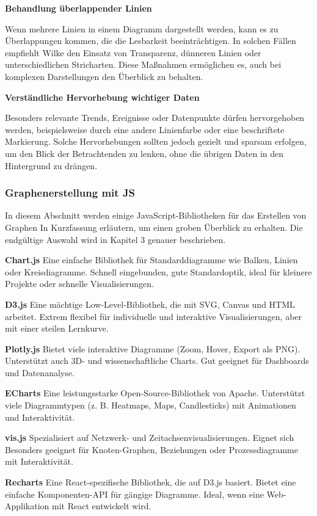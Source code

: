 \item
\textbf{Behandlung überlappender Linien}

Wenn mehrere Linien in einem Diagramm dargestellt werden, kann es zu Überlappungen kommen, die die Lesbarkeit beeinträchtigen.
In solchen Fällen empfiehlt Wilke den Einsatz von Transparenz, dünneren Linien oder unterschiedlichen Stricharten.
Diese Maßnahmen ermöglichen es, auch bei komplexen Darstellungen den Überblick zu behalten.
\item
\textbf{Verständliche Hervorhebung wichtiger Daten}

Besonders relevante Trends, Ereignisse oder Datenpunkte dürfen hervorgehoben werden, beispielsweise durch eine andere Linienfarbe oder eine beschriftete Markierung.
Solche Hervorhebungen sollten jedoch gezielt und sparsam erfolgen, um den Blick der Betrachtenden zu lenken, ohne die übrigen Daten in den Hintergrund zu drängen.

\subsubsection{Graphenerstellung mit JS}

In diesem Abschnitt werden einige JavaScript-Bibliotheken für das Erstellen von Graphen
In Kurzfassung erläutern, um einen groben Überblick zu erhalten.
Die endgültige Auswahl wird in Kapitel 3 genauer beschrieben.

\textbf{Chart.js}
Eine einfache Bibliothek für Standarddiagramme wie Balken, Linien
oder Kreisdiagramme.
Schnell eingebunden, gute Standardoptik, ideal für kleinere Projekte oder schnelle Visualisierungen. \cite{Chartjs2025}

\textbf{D3.js}
Eine mächtige Low-Level-Bibliothek, die mit \ac{SVG}, Canvas und HTML arbeitet.
Extrem flexibel für individuelle und interaktive Visualisierungen, aber mit einer steilen Lernkurve. \cite{D3js2025}

\textbf{Plotly.js}
Bietet viele interaktive Diagramme (Zoom, Hover, Export als PNG). Unterstützt
auch 3D- und wissenschaftliche Charts.
Gut geeignet für Dashboards und Datenanalyse. \cite{Plotlyjs2025}

\textbf{ECharts}
Eine leistungsstarke Open-Source-Bibliothek von Apache. Unterstützt viele
Diagrammtypen (z. B. Heatmaps, Maps, Candlesticks) mit Animationen und Interaktivität. \cite{ECharts2025}

\textbf{vis.js}
Spezialisiert auf Netzwerk- und Zeitachsenvisualisierungen. Eignet sich
Besonders geeignet für Knoten-Graphen, Beziehungen oder Prozessdiagramme mit Interaktivität. \cite{Visjs2025}

\textbf{Recharts}
Eine React-spezifische Bibliothek, die auf D3.js basiert.
Bietet eine einfache Komponenten-API für gängige Diagramme.
Ideal, wenn eine Web-Applikation mit React entwickelt wird. \cite{Recharts2025}












